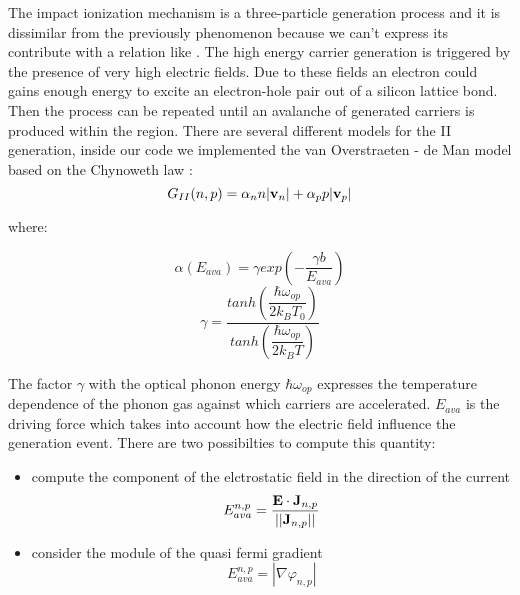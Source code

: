 The impact ionization mechanism is a three-particle generation  process and it is dissimilar from the previously phenomenon because we can't express its contribute with a relation like . The high energy carrier generation is triggered by the presence of very high electric fields. Due to these fields an electron could gains enough energy to excite an electron-hole pair out of a silicon lattice bond. Then the process can be repeated until an avalanche of generated carriers is produced within the region.
There are several different models for the II generation, inside our code we implemented the van Overstraeten - de Man model based on the Chynoweth law \cite{SdeviceManual}:
\begin{equation}
G_{II}(n,p)= \alpha_n n |\mathbf{v}_n| + \alpha_p p |\mathbf{v}_p|
\end{equation}

where:

\begin{equation}
\alpha(E_{ava}) = \gamma exp\left(-\dfrac{\gamma b}{E_{ava}} \right)
\end{equation} 
\begin{equation}
\gamma = \dfrac{tanh\left(\dfrac{\hbar \omega_{op}}{2k_BT_0} \right) }{tanh\left(\dfrac{\hbar \omega_{op}}{2k_BT} \right)}
\end{equation}

The factor $\gamma$ with the optical phonon energy $\hbar \omega_{op}$ expresses the temperature dependence of the phonon gas against which carriers are accelerated.
$E_{ava}$ is the driving force which takes into account how the electric field influence the generation event. There are two possibilties to compute this quantity:
\begin{itemize}
\item compute the component of the elctrostatic field in the direction of the current
\begin{equation}
E_{ava}^{n,p} = \dfrac{\mathbf{E}\cdot\mathbf{J}_{n,p}}{||\mathbf{J}_{n,p}||}
\end{equation}
\item consider the module of the quasi fermi gradient
\begin{equation}
E_{ava}^{n,p} = |\nabla \varphi_{n,p}|
\end{equation}
\end{itemize}

